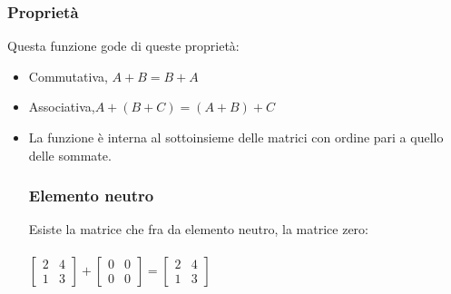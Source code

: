\documentclass[a4paper]{article}
\begin{document}
\subsubsection{Proprietà}
Questa funzione gode di queste proprietà:
\begin{itemize}
\item Commutativa, $A + B = B + A $
\item Associativa,$ A + (B + C) = (A + B) + C$
\item La funzione è interna al sottoinsieme delle matrici con ordine pari a quello delle sommate.

\subsubsection{Elemento neutro}
Esiste la matrice che fra da elemento neutro, la matrice zero: 
\\
\\
$\left[\begin{matrix}2 & 4 \\ 1 & 3\end{matrix}\right] + \left[\begin{matrix}0 & 0 \\ 0 & 0\end{matrix}\right] = \left[\begin{matrix}2 & 4 \\ 1 & 3\end{matrix}\right]
$

\end{itemize}
\end{document}
